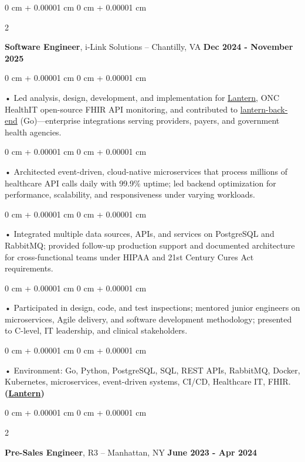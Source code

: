 \documentclass[10pt, letterpaper]{article}
\newenvironment{onecolentry}{
    \begin{adjustwidth}{
        0 cm + 0.00001 cm
    }{
        0 cm + 0.00001 cm
    }
}{
    \end{adjustwidth}
} %
\newenvironment{twocolentry}[2][]{
    \onecolentry
    \def\secondColumn{#2}
    \setcolumnwidth{\fill, 4.5 cm}
    \begin{paracol}{2}
}{
    \switchcolumn \raggedleft \secondColumn
    \end{paracol}
    \endonecolentry
} %
\begin{document}
        \vspace{0.1cm}

        \begin{twocolentry}{
            \textbf{Dec 2024 - November 2025}
        }
            \textbf{Software Engineer}, i-Link Solutions -- Chantilly, VA\end{twocolentry}


        \begin{onecolentry}
             • Led analysis, design, development, and implementation for \href{https://lantern.healthit.gov/?tab=dashboard_tab}{Lantern}, ONC HealthIT open-source FHIR API monitoring, and contributed to \href{https://github.com/onc-healthit/lantern-back-end}{lantern-back-end} (Go)---enterprise integrations serving providers, payers, and government health agencies.
        \end{onecolentry}
        \begin{onecolentry}
             • Architected event-driven, cloud-native microservices that process millions of healthcare API calls daily with 99.9\% uptime; led backend optimization for performance, scalability, and responsiveness under varying workloads.
        \end{onecolentry}
        \begin{onecolentry}
             • Integrated multiple data sources, APIs, and services on PostgreSQL and RabbitMQ; provided follow-up production support and documented architecture for cross-functional teams under HIPAA and 21st Century Cures Act requirements.
        \end{onecolentry}
        \begin{onecolentry}
             • Participated in design, code, and test inspections; mentored junior engineers on microservices, Agile delivery, and software development methodology; presented to C-level, IT leadership, and clinical stakeholders.
        \end{onecolentry}
        \begin{onecolentry}
             • Environment: Go, Python, PostgreSQL, SQL, REST APIs, RabbitMQ, Docker, Kubernetes, microservices, event-driven systems, CI/CD, Healthcare IT, FHIR.\textbf{(\href{https://lantern.healthit.gov/?tab=dashboard_tab}{Lantern})}
        \end{onecolentry}
        \vspace{0.1cm}

        \begin{twocolentry}{
            \textbf{June 2023 - Apr 2024}
        }
            \textbf{Pre-Sales Engineer}, R3 -- Manhattan, NY\end{twocolentry}
\end{document}
